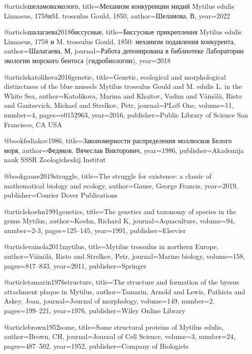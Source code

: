 @article{шеламоваэколого,
  title={Механизм конкуренции мидий Mytilus edulis Linnaeus, 1758иM. trossulus Gould, 1850},
  author={Шеламова, В}, 
year={2022}
}

@article{шалагаева2018биссусные,
  title={Биссусные прикрепления Mytilus edulis Linnaeus, 1758 и M. trossulus Gould, 1850: механизм подавления конкурента},
  author={Шалагаева, М},
  journal={Работа депонирована в библиотеке Лаборатории экологии морского бентоса (гидробиологии)},
  year={2018}
}

@article{katolikova2016genetic,
  title={Genetic, ecological and morphological distinctness of the blue mussels Mytilus trossulus Gould and M. edulis L. in the White Sea},
  author={Katolikova, Marina and Khaitov, Vadim and V{\"a}in{\"o}l{\"a}, Risto and Gantsevich, Michael and Strelkov, Petr},
  journal={PLoS One},
  volume={11},
  number={4},
  pages={e0152963},
  year={2016},
  publisher={Public Library of Science San Francisco, CA USA}
}

@book{fediakov1986,
  title={Закономерности распределения моллюсков Белого моря},
  author={Федяков, Вячеслав Викторович},
  year={1986},
  publisher={Akademija nauk SSSR Zoologicheskij Institut}
}

@book{gause2019struggle,
  title={The struggle for existence: a classic of mathematical biology and ecology},
  author={Gause, George Francis},
  year={2019},
  publisher={Courier Dover Publications}
}

@article{koehn1991genetics,
  title={The genetics and taxonomy of species in the genus Mytilus},
  author={Koehn, Richard K},
  journal={Aquaculture},
  volume={94},
  number={2-3},
  pages={125--145},
  year={1991},
  publisher={Elsevier}
}

@article{vainola2011mytilus,
  title={Mytilus trossulus in northern Europe},
  author={V{\"a}in{\"o}l{\"a}, Risto and Strelkov, Petr},
  journal={Marine biology},
  volume={158},
  pages={817--833},
  year={2011},
  publisher={Springer}
}

@article{tamarin1976structure,
  title={The structure and formation of the byssus attachment plaque in Mytilus},
  author={Tamarin, Arnold and Lewis, Pathicia and Askey, Joan},
  journal={Journal of morphology},
  volume={149},
  number={2},
  pages={199--221},
  year={1976},
  publisher={Wiley Online Library}
}

@article{brown1952some,
  title={Some structural proteins of Mytilus edulis},
  author={Brown, CH},
  journal={Journal of Cell Science},
  volume={3},
  number={24},
  pages={487--502},
  year={1952},
  publisher={Company of Biologists}
}